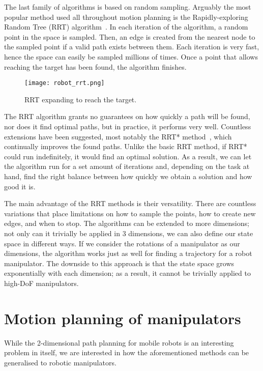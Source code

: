 The last family of algorithms is based on random sampling. Arguably the most popular method used all throughout motion planning is the Rapidly-exploring Random Tree (RRT) algorithm~\cite{LaValle1998RapidlyexploringRT}. In each iteration of the algorithm, a random point in the space is sampled. Then, an edge is created from the nearest node to the sampled point if a valid path exists between them. Each iteration is very fast, hence the space can easily be sampled millions of times. Once a point that allows reaching the target has been found, the algorithm finishes.

\begin{figure}[ht]
  \centering
  \texttt{[image: robot\_rrt.png]}
  \caption{RRT expanding to reach the target.}
\end{figure}

The RRT algorithm grants no guarantees on how quickly a path will be found, nor does it find optimal paths, but in practice, it performs very well. Countless extensions have been suggested, most notably the RRT* method~\cite{rrt_star}, which continually improves the found paths. Unlike the basic RRT method, if RRT* could run indefinitely, it would find an optimal solution. As a result, we can let the algorithm run for a set amount of iterations and, depending on the task at hand, find the right balance between how quickly we obtain a solution and how good it is.

The main advantage of the RRT methods is their versatility. There are countless variations that place limitations on how to sample the points, how to create new edges, and when to stop. The algorithms can be extended to more dimensions; not only can it trivially be applied in 3 dimensions, we can also define our state space in different ways. If we consider the rotations of a manipulator as our dimensions, the algorithm works just as well for finding a trajectory for a robot manipulator. The downside to this approach is that the state space grows exponentially with each dimension; as a result, it cannot be trivially applied to high-DoF manipulators.

\section{Motion planning of manipulators}

While the 2-dimensional path planning for mobile robots is an interesting problem in itself, we are interested in how the aforementioned methods can be generalised to robotic manipulators.

